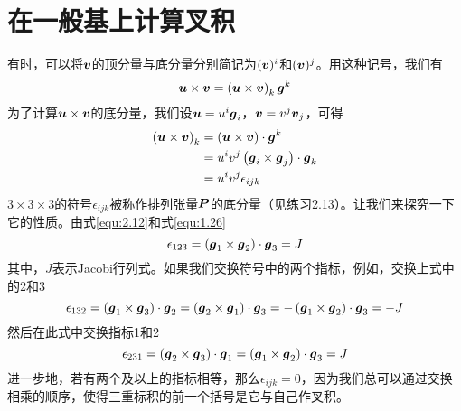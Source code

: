 \section{在一般基上计算叉积}
有时，可以将$\boldsymbol{v}$的顶分量与底分量分别简记为$(\boldsymbol{v})^{i}$和$(\boldsymbol{v})^{j}$。用这种记号，我们有
\begin{equation}\label{equ:2.11}
    \boldsymbol{u}\times \boldsymbol{v}=\left( \boldsymbol{u}\times \boldsymbol{v} \right) _k\boldsymbol{g}^k
\end{equation}
为了计算$\boldsymbol{u}\times \boldsymbol{v}$的底分量，我们设$\boldsymbol{u}=u^{i}\boldsymbol{g}_i$，$\boldsymbol{v}=v^{j}\boldsymbol{v}_j$，可得
\begin{align}
	\left( \boldsymbol{u}\times \boldsymbol{v} \right) _k&=\left( \boldsymbol{u}\times \boldsymbol{v} \right) \cdot \boldsymbol{g}^k\nonumber\\
	&=u^iv^j\left( \boldsymbol{g}_i\times \boldsymbol{g}_j \right) \cdot \boldsymbol{g}_k\nonumber\\
	&=u^iv^j\epsilon _{ijk}\label{equ:2.12}
\end{align}
$3\times 3\times 3$的符号$\epsilon _{ijk}$被称作排列张量$\boldsymbol{P}$的底分量（见练习2.13）。让我们来探究一下它的性质。由式\eqref{equ:2.12}和式\eqref{equ:1.26}
\begin{equation*}
    \epsilon_{123}=(\boldsymbol{g}_{1}\times \boldsymbol{g}_{2})\cdot \boldsymbol{g}_{3}=J
\end{equation*}
其中，$J$表示Jacobi行列式。如果我们交换符号中的两个指标，例如，交换上式中的2和3
\begin{equation*}
    \epsilon _{132}=\left( \boldsymbol{g}_1\times \boldsymbol{g}_3 \right) \cdot \boldsymbol{g}_2=\left( \boldsymbol{g}_2\times \boldsymbol{g}_1 \right) \cdot \boldsymbol{g}_3=-\left( \boldsymbol{g}_1\times \boldsymbol{g}_2 \right) \cdot \boldsymbol{g}_3=-J
\end{equation*}
然后在此式中交换指标1和2
\begin{equation*}
    \epsilon _{231}=\left( \boldsymbol{g}_2\times \boldsymbol{g}_3 \right) \cdot \boldsymbol{g}_1=\left( \boldsymbol{g}_1\times \boldsymbol{g}_2 \right) \cdot \boldsymbol{g}_3=J
\end{equation*}
进一步地，若有两个及以上的指标相等，那么$\epsilon_{ijk}=0$，因为我们总可以通过交换相乘的顺序，使得三重标积的前一个括号是它与自己作叉积。

